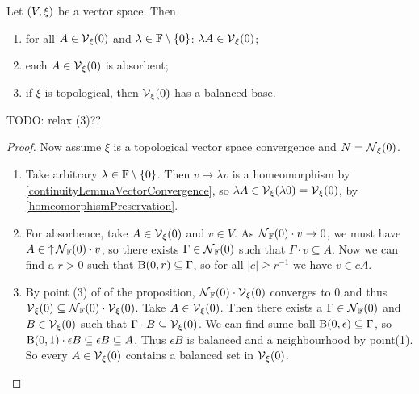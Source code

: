 \begin{corollary} \label{vicinityFilterAtOrigin}
Let $\left( V, \xi \right)$ be a vector space. Then
\begin{enumerate}
\item for all $A\in \operatorname{\mathcal{V}}_\xi(0)$ and $\lambda\in \mathbb{F}\setminus\{0\}$: $\lambda A\in \operatorname{\mathcal{V}}_\xi(0)$;
\item each $A \in \operatorname{\mathcal{V}}_\xi(0)$ is absorbent;
\item if $\xi$ is topological, then $\operatorname{\mathcal{V}}_\xi(0)$ has a balanced base.
\end{enumerate}
\end{corollary}
TODO: relax (3)??
\begin{proof}
Now assume $\xi$ is a topological vector space convergence and $N = \operatorname{\mathcal{N}}_\xi(0)$.
\begin{enumerate}
\item Take arbitrary $\lambda\in\mathbb{F}\setminus\{0\}$. Then $v\mapsto \lambda v$ is a homeomorphism by \ref{continuityLemmaVectorConvergence}, so $\lambda A \in \operatorname{\mathcal{V}}_\xi(\lambda 0) = \operatorname{\mathcal{V}}_\xi(0)$, by \ref{homeomorphismPreservation}.
\item For absorbence, take $A\in \operatorname{\mathcal{V}}_\xi(0)$ and $v\in V$. As $\operatorname{\mathcal{N}}_{\mathbb{F}}(0)\cdot v \to 0$, we must have $A\in \operatorname{\uparrow}\operatorname{\mathcal{N}}_{\mathbb{F}}(0)\cdot v$, so there exists $\Gamma \in \operatorname{\mathcal{N}}_{\mathbb{F}}(0)$ such that $\Gamma\cdot v \subseteq A$. Now we can find a $r>0$ such that $\operatorname{B}(0,r)\subseteq \Gamma$, so for all $|c|\geq r^{-1}$ we have $v\in cA$.
\item By point (3) of of the proposition, $\operatorname{\mathcal{N}}_{\mathbb{F}}(0)\cdot \operatorname{\mathcal{V}}_\xi(0)$ converges to $0$ and thus $\operatorname{\mathcal{V}}_\xi(0) \subseteq \operatorname{\mathcal{N}}_{\mathbb{F}}(0)\cdot\operatorname{\mathcal{V}}_\xi(0)$. Take $A\in \operatorname{\mathcal{V}}_\xi(0)$. Then there exists a $\Gamma\in\operatorname{\mathcal{N}}_{\mathbb{F}}(0)$ and $B\in \operatorname{\mathcal{V}}_\xi(0)$ such that $\Gamma\cdot B \subseteq \operatorname{\mathcal{V}}_\xi(0)$. We can find sume ball $\operatorname{B}(0,\epsilon) \subseteq \Gamma$, so $\operatorname{B}(0,1)\cdot \epsilon B\subseteq \epsilon B \subseteq A$. Thus $\epsilon B$ is balanced and a neighbourhood by point(1). So every $A\in \operatorname{\mathcal{V}}_\xi(0)$ contains a balanced set in $\operatorname{\mathcal{V}}_\xi(0)$.
\end{enumerate}
\end{proof}

